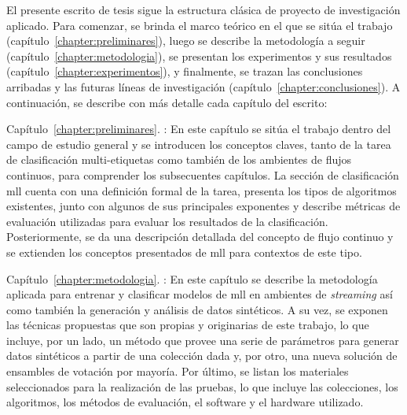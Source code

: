 El presente escrito de tesis sigue la estructura clásica de proyecto de
investigación aplicado. Para comenzar, se brinda el marco teórico en el que se
sitúa el trabajo (capítulo~\ref{chapter:preliminares}), luego se describe la
metodología a seguir (capítulo~\ref{chapter:metodologia}), se presentan los
experimentos y sus resultados (capítulo~\ref{chapter:experimentos}), y
finalmente, se trazan las conclusiones arribadas y las futuras líneas de
investigación (capítulo~\ref{chapter:conclusiones}). A continuación, se describe
con más detalle cada capítulo del escrito:

\begin{description}

	\item{Capítulo~\ref{chapter:preliminares}. }:
	      En este capítulo se sitúa el trabajo dentro del campo de estudio general
	      y se introducen los conceptos claves, tanto de la tarea de clasificación
	      multi-etiquetas como también de los ambientes de flujos continuos, para
	      comprender los subsecuentes capítulos. La sección de clasificación
	      \acrshort{mll} cuenta con una definición formal de la tarea, presenta
	      los tipos de algoritmos existentes, junto con algunos de sus principales
	      exponentes y describe métricas de evaluación utilizadas para evaluar los
	      resultados de la clasificación.  Posteriormente, se da una descripción
	      detallada del concepto de flujo continuo y se extienden los conceptos
	      presentados de \acrshort{mll} para contextos de este tipo.

	\item{Capítulo~\ref{chapter:metodologia}. }: En
	      este capítulo se describe la metodología aplicada para entrenar y
	      clasificar modelos de \acrshort{mll} en ambientes de \textit{streaming}
	      así como también la generación y análisis de datos sintéticos. A su vez,
	      se exponen las técnicas propuestas que son propias y originarias de este
	      trabajo, lo que incluye, por un lado, un método que provee una serie de
	      parámetros para generar datos sintéticos a partir de una colección dada
	      y, por otro, una nueva solución de ensambles de votación por mayoría.
	      Por último, se listan los materiales seleccionados para la realización
	      de las pruebas, lo que incluye las colecciones, los algoritmos, los
	      métodos de evaluación, el software y el hardware utilizado.


\end{description}
